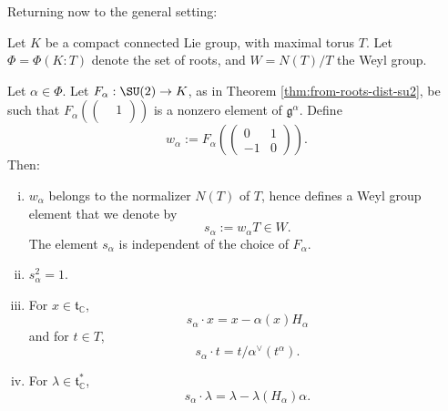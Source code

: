 \documentclass[reqno]{amsart} 
\begin{document}
Returning now to the general setting:
\begin{theorem}
  Let $K$ be a compact connected Lie group, with maximal torus $T$.  Let $\Phi = \Phi(K:T)$ denote the set of roots, and $W = N(T)/T$ the Weyl group.
  
  Let $\alpha \in \Phi$.  Let $F_\alpha : \SU(2) \rightarrow K$, as in Theorem \ref{thm:from-roots-dist-su2}, be such that $F_\alpha (
\begin{pmatrix}
    & 1 \\
    &
  \end{pmatrix}
)$ is a nonzero element of $\mathfrak{g}^{\alpha}$.  Define
  \begin{equation}\label{eq:}
    w_\alpha := F_\alpha (
\begin{pmatrix}
      0 & 1 \\
      -1 & 0
    \end{pmatrix}
).
  \end{equation}
  Then:
  \begin{enumerate}
[(i)]
  \item $w_\alpha$ belongs to the normalizer $N(T)$ of $T$, hence defines a Weyl group element that we denote by
    \begin{equation}\label{eq:}
      s_\alpha := w_\alpha T \in W.
    \end{equation}
    The element $s_\alpha$ is independent of the choice of $F_\alpha$.
  \item $s_\alpha^2 = 1$.
  \item For $x \in \mathfrak{t}_{\mathbb{C}}$,
    \begin{equation}\label{eq:}
      s_\alpha \cdot x = x - \alpha(x) H_\alpha
    \end{equation}
    and for $t \in T$,
    \begin{equation}\label{eq:}
      s_\alpha \cdot t = t / \alpha^\vee(t^\alpha).
    \end{equation}
  \item For $\lambda \in \mathfrak{t}_{\mathbb{C}}^*$,
    \begin{equation}\label{eq:}
      s_\alpha \cdot \lambda  = \lambda  - \lambda(H_\alpha) \alpha.
    \end{equation}
  \end{enumerate}
\end{theorem}
\end{document}
